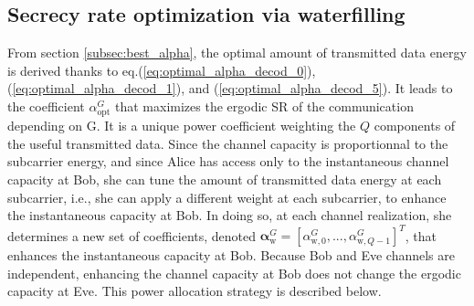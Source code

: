 \documentclass[12pt, draftclsnofoot, onecolumn]{IEEEtran}
\newcommand{\mat}[1]{\boldsymbol{\mathrm{#1}}}
\begin{document}
\subsection{Secrecy rate optimization via waterfilling}
\label{subsec:perf_waterf}
From section \ref{subsec:best_alpha}, the optimal amount of transmitted data energy is derived thanks to eq.(\ref{eq:optimal_alpha_decod_0}), (\ref{eq:optimal_alpha_decod_1}), and (\ref{eq:optimal_alpha_decod_5}). It leads to the coefficient $\alpha_{\text{opt}}^G$ that maximizes the ergodic SR of the communication depending on $\mat{G}$. It is a unique power coefficient weighting the $Q$ components of the useful transmitted data.  Since the channel capacity is proportionnal to the subcarrier energy, and since Alice has access only to the instantaneous channel capacity at Bob, she can tune the amount of transmitted data energy at each subcarrier, i.e., she can apply a different weight at each subcarrier, to enhance the instantaneous capacity at Bob. In doing so, at each channel realization, she determines a new set of coefficients, denoted $\boldsymbol\alpha_{\text{w}}^G = [\alpha_{\text{w},0}^G,...,\alpha_{\text{w},Q-1}^G]^T $, that enhances the instantaneous capacity at Bob. Because Bob and Eve channels are independent, enhancing the channel capacity at Bob does not change the ergodic capacity at Eve. This power allocation strategy is described below. 
\end{document}

